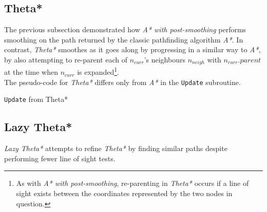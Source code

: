 \documentclass[12pt,notitlepage]{report}
\begin{document}
\subsection {Theta*}

The previous subsection demonstrated how {\em A* with post-smoothing} performs smoothing on the path returned by the classic pathfinding algorithm {\em A*}. In contrast, {\em Theta*} smoothes as it goes along by progressing in a similar way to {\em A*}, by also attempting to re-parent each of $n_{curr}$'s neighbours $n_{neigh}$ with $n_{curr}.parent$ at the time when $n_{curr}$ is expanded\footnote{As with {\em A* with post-smoothing}, re-parenting in {\em Theta*} occurs if a line of sight exists between the coordinates represented by the two nodes in question.}.\\

\noindent
The pseudo-code for {\em Theta*} differs only from {\em A*} in the {\tt Update} subroutine.

\begin{algorithm}
  \SetAlgoLined\DontPrintSemicolon
  \caption{{\tt Update} from {\sc Theta*}}
\end{algorithm} 

\subsection {Lazy Theta*}

{\em Lazy Theta*} attempts to refine {\em Theta*} by finding similar paths despite performing fewer line of sight tests.\\
\end{document}
